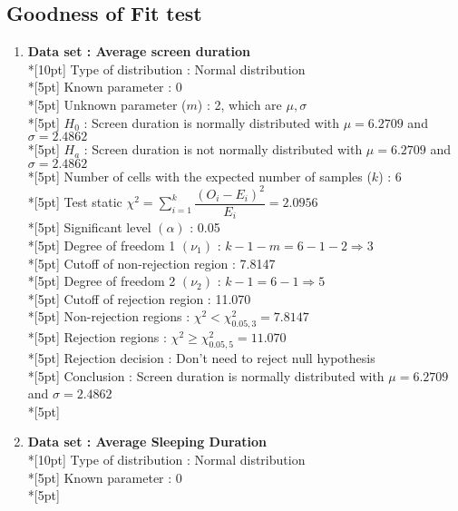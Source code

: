 \subsection*{Goodness of Fit test}

\begin{enumerate}
    \item \textbf{Data set : Average screen duration}\\*[10pt]
        Type of distribution : Normal distribution\\*[5pt]
        Known parameter : 0\\*[5pt]
        Unknown parameter ($m$) : 2, which are \(\mu, \sigma\)\\*[5pt]
        $H_0$ : Screen duration is normally distributed with $\mu=6.2709$ and $\sigma=2.4862$\\*[5pt]
        $H_a$ : Screen duration is not normally distributed with $\mu=6.2709$ and $\sigma=2.4862$\\*[5pt]
        Number of cells with the expected number of samples ($k$) : 6\\*[5pt]
        Test static \(\chi^2=\displaystyle\sum\limits^k_{i=1}\dfrac{\left(O_i-E_i\right)^2}{E_i} = 2.0956\)\\*[5pt]
        Significant level \(\left(\alpha\right)\) : 0.05\\*[5pt]
        Degree of freedom 1 \((\nu_1)\) : $k - 1 - m = 6 - 1 - 2 \Rightarrow 3$\\*[5pt]
        Cutoff of non-rejection region : 7.8147\\*[5pt]
        Degree of freedom 2 \((\nu_2)\) : $k - 1 = 6 - 1 \Rightarrow 5$\\*[5pt]
        Cutoff of rejection region : 11.070\\*[5pt]
        Non-rejection regions : \(\chi^2 < \chi^2_{0.05, 3}=7.8147\)\\*[5pt]
        Rejection regions : \(\chi^2 \geq \chi^2_{0.05, 5}=11.070\)\\*[5pt]
        Rejection decision : Don't need to reject null hypothesis\\*[5pt]
        Conclusion : Screen duration is normally distributed with $\mu=6.2709$ and $\sigma=2.4862$\\*[5pt]
    \item \textbf{Data set : Average Sleeping Duration}\\*[10pt]
        Type of distribution : Normal distribution\\*[5pt]
        Known parameter : 0\\*[5pt]

\end{enumerate}
